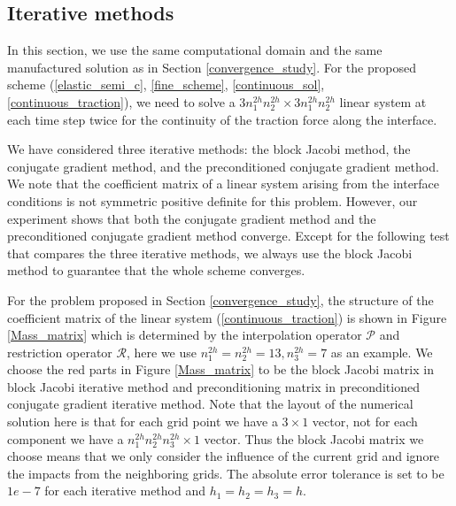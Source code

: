 \subsection{Iterative methods}\label{iterative_section}
In this section, we use the same computational domain and the same manufactured solution as in Section \ref{convergence_study}. For the proposed scheme (\ref{elastic_semi_c}, \ref{fine_scheme}, \ref{continuous_sol}, \ref{continuous_traction}), we need to solve a $3n_1^{2h}n_2^{2h}\times 3n_1^{2h}n_2^{2h}$ linear system at each time step twice for the continuity of the traction force along the interface. 

We have considered three iterative methods: the block Jacobi method, the conjugate gradient method, and the preconditioned conjugate gradient method. We note that the coefficient matrix of a linear system arising from the interface conditions is not symmetric positive definite for this problem. However, our experiment shows that both the conjugate gradient method and the preconditioned conjugate gradient method converge. Except for the following test that compares the three iterative methods, we always use the block Jacobi method to guarantee that the whole scheme converges. 

For the problem proposed in Section \ref{convergence_study}, the structure of the coefficient matrix of the linear system (\ref{continuous_traction}) is shown in Figure \ref{Mass_matrix} which is determined by the interpolation operator ${\mathcal{P}}$ and restriction operator ${\mathcal{R}}$, here we use $n_1^{2h} = n_2^{2h}=13, n_3^{2h} = 7$ as an example. We choose the red parts in Figure \ref{Mass_matrix} to be the block Jacobi matrix in block Jacobi iterative method and preconditioning matrix in preconditioned conjugate gradient iterative method. Note that the layout of the numerical solution here is that for each grid point we have a $3\times1$ vector, not for each component we have a $n_1^{2h}n_2^{2h}n_3^{2h}\times1$ vector.  Thus the block Jacobi matrix we choose means that we only consider the influence of the current grid and ignore the impacts from the neighboring grids. The absolute error tolerance is set to be $1e-7$ for each iterative method and $h_1 = h_2 = h_3 = h$.

